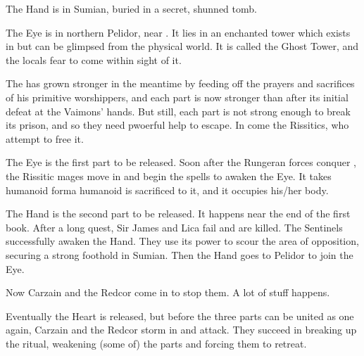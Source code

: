 The Hand is in Sumian, buried in a secret, shunned tomb. 

The Eye is in northern Pelidor, near \Forklin. It lies in an enchanted tower which exists in \Nyx{} but can be glimpsed from the physical world. It is called the Ghost Tower, and the locals fear to come within sight of it. 

The \Haskelek{} has grown stronger in the meantime by feeding off the prayers and sacrifices of his primitive worshippers, and each part is now stronger than after its initial defeat at the Vaimons' hands. But still, each part is not strong enough to break its prison, and so they need pwoerful help to escape. In come the Rissitics, who attempt to free it. 

The Eye is the first part to be released. Soon after the Rungeran forces conquer \Forklin, the Rissitic mages move in and begin the spells to awaken the Eye. It takes humanoid form\dash a humanoid is sacrificed to it, and it occupies his/her body. 

The Hand is the second part to be released. It happens near the end of the first book. After a long quest, Sir James and Lica fail and are killed. The Sentinels successfully awaken the Hand. They use its power to scour the area of opposition, securing a strong foothold in Sumian. Then the Hand goes to Pelidor to join the Eye. 

Now Carzain and the Redcor come in to stop them. A lot of stuff happens. 


Eventually the Heart is released, but before the three parts can be united as one again, Carzain and the Redcor storm in and attack. They succeed in breaking up the ritual, weakening (some of) the \Haskelek{} parts and forcing them to retreat.


